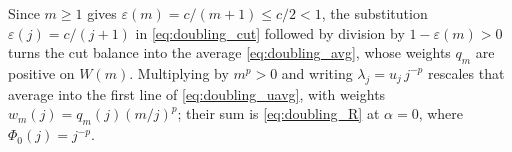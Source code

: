 Since $m\geq1$ gives $\varepsilon(m)=c/(m+1)\leq c/2<1$, the substitution
$\varepsilon(j)=c/(j+1)$ in \eqref{eq:doubling_cut} followed by division by
$1-\varepsilon(m)>0$ turns the cut balance into the average \eqref{eq:doubling_avg}, whose
weights $q_m$ are positive on $W(m)$. Multiplying by $m^{p}>0$ and writing
$\lambda_j=u_j\,j^{-p}$ rescales that average into the first line of
\eqref{eq:doubling_uavg}, with weights $w_m(j)=q_m(j)(m/j)^{p}$; their sum is
\eqref{eq:doubling_R} at $\alpha=0$, where $\Phi_0(j)=j^{-p}$.
